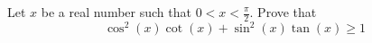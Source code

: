 Let $x$ be a real number such that $0<x<\frac{\pi}{2}$. Prove that\[\cos^2(x)\cot (x)+\sin^2(x)\tan (x)\ge 1\]